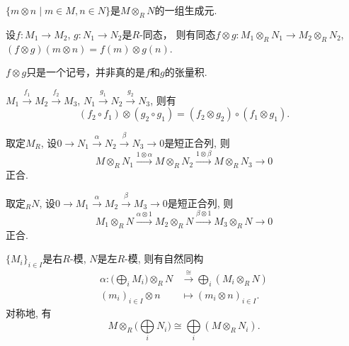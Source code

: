 \begin{proposition}
    $\{m\otimes n\mid m\in M, n\in N\}$是$M \otimes_R N$的一组生成元.
\end{proposition}

\begin{proposition}
    设$f:M_1\rightarrow M_2$, $g:N_1\rightarrow N_2$是$R$-同态， 
    则有同态$f\otimes g: M_1\otimes_R N_1\rightarrow M_2 \otimes_R N_2$, 
$(f\otimes g)(m\otimes n)=f(m)\otimes g(n)$.
\end{proposition}

\begin{remark}
    $f\otimes g$只是一个记号，并非真的是$f$和$g$的张量积.
\end{remark}

\begin{proposition}
    $M_1\xrightarrow{f_1} M_2 \xrightarrow{f_2} M_3$, 
    $N_1\xrightarrow{g_1} N_2\xrightarrow{g_2} N_3$, 则有
    $$(f_2\circ f_1)\otimes (g_2\circ g_1)
    =(f_2\otimes g_2)\circ (f_1\otimes g_1).$$
\end{proposition}

\begin{proposition}
    取定$M_R$, 设$0 \rightarrow N_1\xrightarrow{\alpha} N_2 \xrightarrow{\beta} N_3\rightarrow 0$是短正合列, 则
        $$M\otimes_R N_1 \xrightarrow{1\otimes \alpha} M\otimes_R N_2 \xrightarrow{1\otimes \beta} M \otimes_R N_3 \rightarrow 0$$
正合.
\end{proposition}

\begin{proposition}
    取定$_RN$, 设$0 \rightarrow M_1\xrightarrow{\alpha} M_2 \xrightarrow{\beta} M_3\rightarrow 0$是短正合列, 则
        $$M_1\otimes_R N \xrightarrow{\alpha \otimes 1} M_2\otimes_R N \xrightarrow{\beta \otimes 1} M_3 \otimes_R N \rightarrow 0$$
正合.
\end{proposition}

\begin{proposition} $\{M_i\}_{i\in I}$是右$R$-模, $N$是左$R$-模, 则有自然同构
    \begin{align*}
        \alpha: \Big(\bigoplus\limits_i M_i\Big) \otimes_R N &\xrightarrow{\cong} \bigoplus\limits_i (M_i \otimes_R N)\\
        (m_i)_{i\in I}\otimes n &\mapsto (m_i\otimes n)_{i\in I}.
    \end{align*}
对称地, 有
    $$M\otimes_R \Big(\bigoplus\limits_i N_i\Big)\cong \bigoplus\limits_i (M\otimes_R N_i).$$
\end{proposition}

